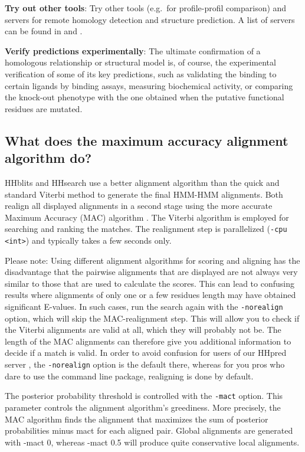 \documentclass[11pt,a4paper]{article}
\begin{document}
{\bf Try out other tools}:
Try other tools (e.g.\ for profile-profil comparison) and servers for remote homology detection and structure prediction. 
A list of servers can be found in \cite{Mariani:2011} and \cite{Battey:2007}.

{\bf Verify predictions experimentally}: 
The ultimate confirmation of a homologous relationship or structural model is, of course, the experimental verification of some of its key predictions, such as validating the binding to certain ligands by binding assays, measuring biochemical activity, or comparing the knock-out phenotype with the one obtained when the putative functional residues are mutated.


\subsection{What does the maximum accuracy alignment algorithm do?} \label{MAC}
HHblits and HHsearch use a better alignment algorithm than the quick and 
standard Viterbi method to generate the final HMM-HMM alignments. Both realign
all displayed alignments in a second stage using the more accurate Maximum Accuracy 
(MAC) algorithm \cite{Durbin:2008,Biegert:2008}. The Viterbi algorithm is employed 
for searching and ranking the matches. The realignment step is parallelized 
(\verb`-cpu <int>`) and typically takes a few seconds only.    

Please note: Using different alignment algorithms for scoring and aligning has the 
disadvantage that the pairwise alignments that are displayed are not always very similar to 
those that are used to calculate the scores. This can lead to confusing results 
where alignments of only one or a few residues length may have obtained significant
E-values. In such cases, run the search again with the \verb`-norealign` option, which will 
skip the MAC-realignment step. This will allow you to check if the Viterbi alignments 
are valid at all, which they will probably not be. The length of the MAC alignments 
can therefore give you additional information to decide if a match is valid. In order
to avoid confusion for users of our HHpred server \cite{Soding:2005b, Hildebrand:2009}, 
the \verb`-norealign` option is the default there, whereas for you pros who dare to use 
the command line package, realigning is done by default.

The posterior probability threshold is controlled with the \verb`-mact` option. 
This parameter controls the alignment algorithm's greediness. More precisely, the 
MAC algorithm finds the alignment that maximizes the sum of posterior probabilities 
minus mact for each aligned pair. Global alignments are generated with -mact 0, 
whereas -mact 0.5 will produce quite conservative local alignments. 
\end{document}
